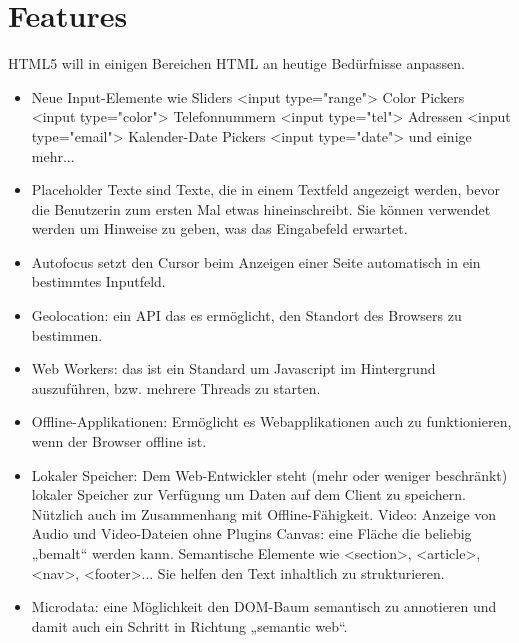 \documentclass[a4paper,10pt]{scrreprt}
\begin{document}
\section{Features}
HTML5 will in einigen Bereichen HTML an heutige Bedürfnisse anpassen.
\begin{itemize}
 \item Neue Input-Elemente wie
\subitem Sliders <input type="range">
\subitem Color Pickers <input type="color">
\subitem Telefonnummern <input type="tel">
\subitem Adressen <input type="email">
\subitem Kalender-Date Pickers <input type="date">
\subitem und einige mehr...
\item Placeholder Texte sind Texte, die in einem Textfeld angezeigt werden, bevor die Benutzerin
zum ersten Mal etwas hineinschreibt. Sie können verwendet werden um Hinweise zu geben,
was das Eingabefeld erwartet.
\item  Autofocus setzt den Cursor beim Anzeigen einer Seite automatisch in ein bestimmtes
Inputfeld.
\item  Geolocation: ein API das es ermöglicht, den Standort des Browsers zu bestimmen.
\item  Web Workers: das ist ein Standard um Javascript im Hintergrund auszuführen, bzw. mehrere
Threads zu starten.
\item  Offline-Applikationen: Ermöglicht es Webapplikationen auch zu funktionieren, wenn der
Browser offline ist.
\item  Lokaler Speicher: Dem Web-Entwickler steht (mehr oder weniger beschränkt) lokaler
Speicher zur Verfügung um Daten auf dem Client zu speichern. Nützlich auch im
Zusammenhang mit Offline-Fähigkeit.
\subitem  Video: Anzeige von Audio und Video-Dateien ohne Plugins
\subitem  Canvas: eine Fläche die beliebig „bemalt“ werden kann.
\subitem Semantische Elemente wie <section>, <article>, <nav>, <footer>... Sie
helfen den Text inhaltlich zu strukturieren.
\item  Microdata: eine Möglichkeit den DOM-Baum semantisch zu annotieren und damit auch ein
Schritt in Richtung „semantic web“.
\end{itemize}
\end{document}
